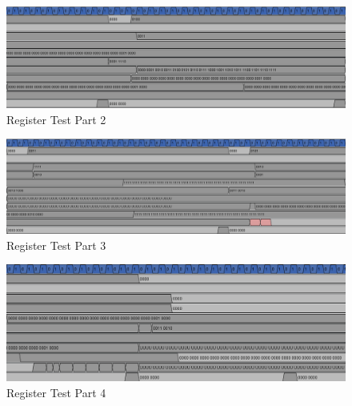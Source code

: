 \begin{figure}[!ht]
    \centering
    \includegraphics[width=\textwidth]{Images/Register Test Part 2.png}
    \caption{Register Test Part 2}
\end{figure}

\begin{figure}[!ht]
    \centering
    \includegraphics[width=\textwidth]{Images/Register Test Part 3.png}
    \caption{Register Test Part 3}
\end{figure}

\begin{figure}[!ht]
    \centering
    \includegraphics[width=\textwidth]{Images/Register Test Part 4.png}
    \caption{Register Test Part 4}
\end{figure}